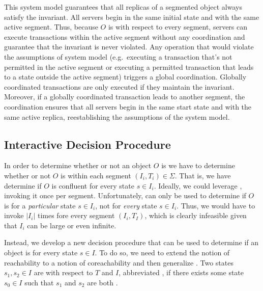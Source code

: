 This system model guarantees that all replicas of a segmented
\invariantconfluent{} object always satisfy the invariant. All servers begin in
the same initial state and with the same active segment. Thus, because $O$ is
\invariantconfluent{} with respect to every segment, servers can execute
transactions within the active segment without any coordination and guarantee
that the invariant is never violated. Any operation that would violate the
assumptions of \invariantconfluence{} system model (e.g.\ executing a transaction
that's not permitted in the active segment or executing a permitted transaction
that leads to a state outside the active segment) triggers a global
coordination. Globally coordinated transactions are only executed if they
maintain the invariant. Moreover, if a globally coordinated transaction leads
to another segment, the coordination ensures that all servers begin in the same
start state and with the same active replica, reestablishing the assumptions of
the \invariantconfluence{} system model.

\subsection{Interactive Decision Procedure}
In order to determine whether or not an object $O$ is \sTISconfluent{} we have
to determine whether or not $O$ is \invariantconfluent{} within each segment
$(I_i, T_i) \in \Sigma$. That is, we have determine if $O$ is
 confluent for every state $s \in I_i$. Ideally, we
could leverage , invoking it once per
segment. Unfortunately,  can only be used
to determine if $O$ is  for a \emph{particular} state
$s \in I_i$, not for \emph{every} state $s \in I_i$. Thus, we would have to
invoke  $|I_i|$ times fore every segment
$(I_i, T_I)$, which is clearly infeasible given that $I_i$ can be large or even
infinite.

Instead, we develop a new decision procedure that can be used to determine if
an object is  for every state $s \in I$. To do so, we
need to extend the notion of reachability to a notion of coreachability and
then generalize . Two states $s_1, s_2
\in I$ are  with respect to $T$ and $I$, abbreviated
, if there exists some state $s_0 \in I$
such that $s_1$ and $s_2$ are both \sTIreachable{}.

